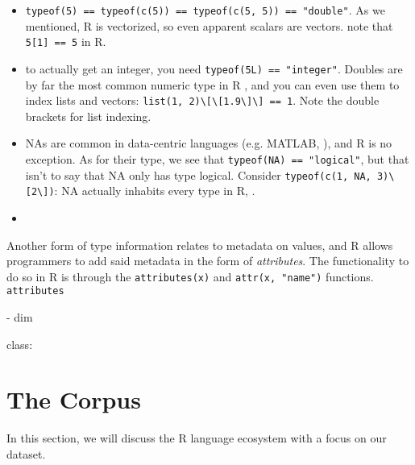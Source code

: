 \documentclass[acmsmall,10pt,review,anonymous]{acmart}\settopmatter{printfolios=true,printccs=false,printacmref=false}
\newcommand{\code}[1]{\lstinline|#1|\xspace}
\begin{document}
\begin{itemize}

	\item \code{typeof(5) == typeof(c(5)) == typeof(c(5, 5)) == "double"}.
	As we mentioned, R is vectorized, so even apparent scalars are vectors.
	 note that \code{5[1] == 5} in R.
	
	\item to actually get an integer, you need \code{typeof(5L) == "integer"}.
	Doubles are by far the most common numeric type in R , and you can even use them to index lists and vectors: \code{list(1, 2)\[\[1.9\]\] == 1}.
	Note the double brackets for list indexing.
	
	\item NAs are common in data-centric languages (e.g. MATLAB, ), and R is no exception.
	As for their type, we see that \code{typeof(NA) == "logical"}, but that isn't to say that NA only has type logical.
	Consider \code{typeof(c(1, NA, 3)\[2\])}: NA actually inhabits every type in R, .

	\item {}

\end{itemize}

Another form of type information relates to metadata on values, and R allows programmers to add said metadata in the form of {\it attributes}.
The functionality to do so in R is through the \code{attributes(x)} and \code{attr(x, "name")}  functions.
\code{attributes} 

  - dim

class:

%
%

\section{The Corpus}

In this section, we will discuss the R language ecosystem with a focus on our dataset.
\end{document}
